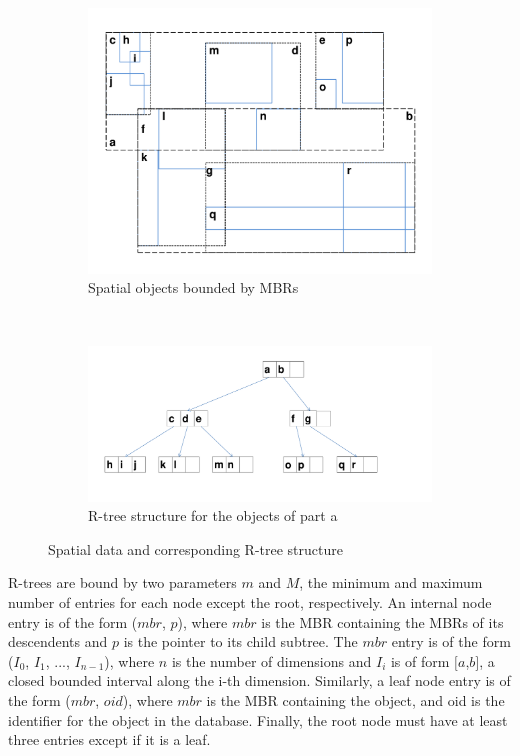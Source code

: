 \begin{figure}[t]
	\begin{subfigure}{0.48\textwidth}
		\includegraphics[width=\textwidth]{./figures/R_Tree_objects.pdf}
		\caption{Spatial objects bounded by MBRs}
		\label{fig:R-Tree_objects}
	\end{subfigure}
	~
	\begin{subfigure}{0.48\textwidth}
		\includegraphics[width=\textwidth]{./figures/R_Tree_structure.pdf}
		\caption{R-tree structure for the objects of part a}
		\label{fig:R-Tree_structure}
	\end{subfigure}
	\caption{Spatial data and corresponding R-tree structure}
\end{figure}


R-trees are bound by two parameters $m$ and $M$, the minimum and maximum number
of entries for each node except the root, respectively. An internal node entry 
is of the form ($mbr$, $p$), where $mbr$ is the MBR containing the MBRs of its 
descendents and $p$ is the pointer to its child subtree. The $mbr$ entry is of 
the form ($I_{0}$, $I_{1}$, ..., $I_{n-1}$), where $n$ is the number of 
dimensions and $I_{i}$ is of form $[a$,$b]$, a closed bounded interval along 
the i-th dimension. Similarly, a leaf node entry is of the form ($mbr$, $oid$), 
where $mbr$ is the MBR containing the object, and oid is the identifier for the 
object in the database. Finally, the root node must have at least three entries
except if it is a leaf.


